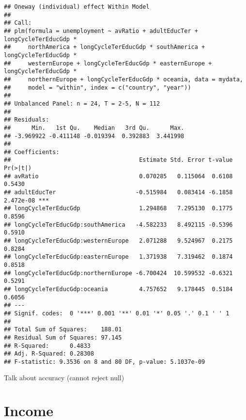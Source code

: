 \documentclass[
]{article}
\newenvironment{Shaded}{\begin{snugshade}}{\end{snugshade}}
\newcommand{\AttributeTok}[1]{\textcolor[rgb]{0.77,0.63,0.00}{#1}}
\newcommand{\DecValTok}[1]{\textcolor[rgb]{0.00,0.00,0.81}{#1}}
\newcommand{\FloatTok}[1]{\textcolor[rgb]{0.00,0.00,0.81}{#1}}
\newcommand{\FunctionTok}[1]{\textcolor[rgb]{0.00,0.00,0.00}{#1}}
\newcommand{\NormalTok}[1]{#1}
\newcommand{\SpecialCharTok}[1]{\textcolor[rgb]{0.00,0.00,0.00}{#1}}
\begin{document}
\begin{verbatim}
## Oneway (individual) effect Within Model
## 
## Call:
## plm(formula = unemployment ~ avRatio + adultEducTer + longCycleTerEducGdp * 
##     northAmerica + longCycleTerEducGdp * southAmerica + longCycleTerEducGdp * 
##     westernEurope + longCycleTerEducGdp * easternEurope + longCycleTerEducGdp * 
##     northernEurope + longCycleTerEducGdp * oceania, data = mydata, 
##     model = "within", index = c("country", "year"))
## 
## Unbalanced Panel: n = 24, T = 2-5, N = 112
## 
## Residuals:
##      Min.   1st Qu.    Median   3rd Qu.      Max. 
## -3.969922 -0.411148 -0.019394  0.392883  3.441998 
## 
## Coefficients:
##                                     Estimate Std. Error t-value  Pr(>|t|)    
## avRatio                             0.070285   0.115064  0.6108    0.5430    
## adultEducTer                       -0.515984   0.083414 -6.1858 2.472e-08 ***
## longCycleTerEducGdp                 1.294868   7.295130  0.1775    0.8596    
## longCycleTerEducGdp:southAmerica   -4.582233   8.492115 -0.5396    0.5910    
## longCycleTerEducGdp:westernEurope   2.071288   9.524967  0.2175    0.8284    
## longCycleTerEducGdp:easternEurope   1.371938   7.319462  0.1874    0.8518    
## longCycleTerEducGdp:northernEurope -6.700424  10.599532 -0.6321    0.5291    
## longCycleTerEducGdp:oceania         4.757652   9.178445  0.5184    0.6056    
## ---
## Signif. codes:  0 '***' 0.001 '**' 0.01 '*' 0.05 '.' 0.1 ' ' 1
## 
## Total Sum of Squares:    188.01
## Residual Sum of Squares: 97.145
## R-Squared:      0.4833
## Adj. R-Squared: 0.28308
## F-statistic: 9.3536 on 8 and 80 DF, p-value: 5.1037e-09
\end{verbatim}

Talk about accuracy (cannot reject null)

\hypertarget{income}{%
\section{Income}\label{income}}

\begin{Shaded}
\end{Shaded}
\end{document}
